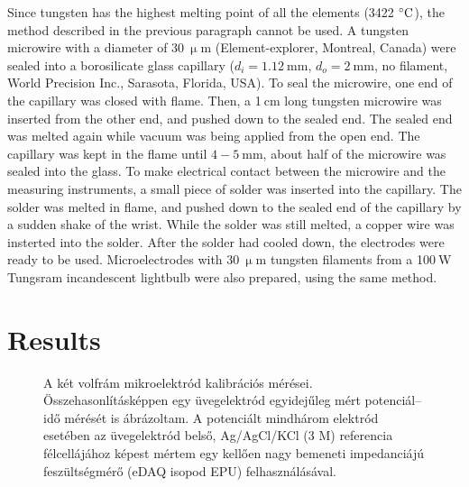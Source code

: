 \documentclass[manuscript=article, journal=jceda8]{achemso}
\begin{document}
Since tungsten has the highest melting point of all the elements (3422 $\celsius$), the method described in the previous paragraph cannot be used.
A tungsten microwire with a diameter of $30~\upmu$m (Element-explorer, Montreal, Canada) were sealed into a borosilicate glass capillary ($d_i=1.12~$mm, $d_o=2~$mm, no filament, World Precision Inc., Sarasota, Florida, USA).
To seal the microwire, one end of the capillary was closed with flame.
Then, a 1$~$cm long tungsten microwire was inserted from the other end, and pushed down to the sealed end.
The sealed end was melted again while vacuum was being applied from the open end.
The capillary was kept in the flame until $4-5~$mm, about half of the microwire was sealed into the glass.
To make electrical contact between the microwire and the measuring instruments, a small piece of solder was inserted into the capillary.
The solder was melted in flame, and pushed down to the sealed end of the capillary by a sudden shake of the wrist.
While the solder was still melted, a copper wire was insterted into the solder.
After the solder had cooled down, the electrodes were ready to be used.
Microelectrodes with $30~\upmu$m tungsten filaments from a 100$~$W Tungsram incandescent lightbulb were also prepared, using the same method.




\section{Results}

\begin{figure}
\centering
{}
\caption{A két volfrám mikroelektród kalibrációs mérései. Összehasonlításképpen egy üvegelektród egyidejűleg mért potenciál--idő mérését is ábrázoltam. A potenciált mindhárom elektród esetében az üvegelektród belső, Ag/AgCl/KCl (3 M) referencia félcellájához képest mértem egy kellően nagy bemeneti impedanciájú feszültségmérő (eDAQ isopod EPU) felhasználásával.}
\label{fig:kalibracios_meres}
\end{figure}
\end{document}
